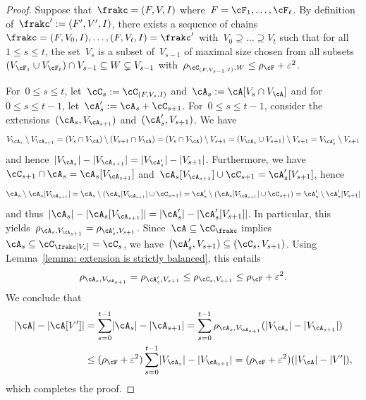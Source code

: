 \documentclass[11pt]{amsart}
\newcommand{\eps}{\varepsilon}
\DeclarePairedDelimiter{\abs}{\lvert}{\rvert}
\theoremstyle{definition}
\numberwithin{equation}{section}
\begin{document}
	\begin{proof}
		Suppose that~$\frakc=(F,V,I)$ where~$F=\cF_1,\ldots,\cF_\ell$.
		By definition of~$\frakc':=(F',V',I)$, there exists a sequence of chains~$\frakc=(F,V_0,I),\ldots,(F,V_t,I)=\frakc'$ with~$V_0\supseteq\ldots\supseteq V_t$ such that for all~$1\leq s\leq t$, the set~$V_s$ is a subset of~$V_{s-1}$ of maximal size chosen from all subsets~$(V_{\cF_1}\cup V_{\cF_\ell})\cap V_{s-1}\subseteq W\subsetneq V_{s-1}$ with~$\rho_{\cC_{(F,V_{s-1},I)},W}\leq \rho_\cF+\eps^2$.
		
		For~$0\leq s\leq t$, let~$\cC_s:=\cC_{(F,V_s,I)}$ and~$\cA_s:=\cA[V_s\cap V_\cA]$ and for~$0\leq s\leq t-1$, let~$\cA_s':=\cA_s+\cC_{s+1}$.
		For~$0\leq s\leq t-1$, consider the extensions~$(\cA_s,V_{\cA_{s+1}})$ and~$(\cA_s',V_{s+1})$.
		We have
		\begin{equation*}
			V_{\cA_s}\setminus V_{\cA_{s+1}}
			=(V_s \cap V_\cA)\setminus(V_{s+1}\cap V_\cA)
			=(V_s\cap V_\cA)\setminus V_{s+1}
			=(V_{\cA_s}\cup V_{s+1})\setminus V_{s+1}
			=V_{\cA_s'}\setminus V_{s+1}
		\end{equation*}
		and hence~$\abs{V_{\cA_s}}-\abs{V_{\cA_{s+1}}}=\abs{V_{\cA_s'}}-\abs{V_{s+1}}$.
		Furthermore, we have~$\cC_{s+1}\cap \cA_s= \cA_s[V_{\cA_{s+1}}]$ and~$\cA_s[V_{\cA_{s+1}}]\cup \cC_{s+1}=\cA_s'[V_{s+1}]$, hence
		\begin{equation*}
			\cA_s\setminus \cA_s[V_{\cA_{s+1}}]
			=\cA_s\setminus (\cA_s[V_{\cA_{s+1}}]\cup \cC_{s+1})
			=\cA_s'\setminus (\cA_s[V_{\cA_{s+1}}]\cup \cC_{s+1})
			=\cA_s'\setminus \cA_s'[V_{s+1}]
		\end{equation*}
		and thus~$\abs{\cA_s}-\abs{\cA_s[V_{\cA_{s+1}}]}=\abs{\cA_s'}-\abs{\cA_s'[V_{s+1}]}$.
		In particular, this yields~$\rho_{\cA_s,V_{\cA_{s+1}}}=\rho_{\cA_s',V_{s+1}}$.
		Since~$\cA\subseteq\cC_\frakc$ implies~$\cA_s\subseteq \cC_\frakc[V_s]=\cC_s$, we have~$(\cA_{s}',V_{s+1})\subseteq (\cC_s,V_{s+1})$.
		Using Lemma~\ref{lemma: extension is strictly balanced}, this entails
		\begin{equation*}
			\rho_{\cA_s,V_{\cA_{s+1}}}
			=\rho_{\cA_s',V_{s+1}}
			\leq \rho_{\cC_s,V_{s+1}}
			\leq \rho_\cF+\eps^2.
		\end{equation*}
		We conclude that
		\begin{align*}
			\abs{\cA}-\abs{\cA[V']}
			&=\sum_{s=0}^{t-1} \abs{\cA_{s}}-\abs{\cA_{s+1}}
			=\sum_{s=0}^{t-1} \rho_{\cA_s,V_{\cA_{s+1}}}(\abs{V_{\cA_s}}-\abs{V_{\cA_{s+1}}})\\
			&\leq (\rho_{\cF}+\eps^2)\sum_{s=0}^{t-1} \abs{V_{\cA_s}}-\abs{V_{\cA_{s+1}}}
			=(\rho_{\cF}+\eps^2)(\abs{V_\cA}-\abs{V'}),
		\end{align*}
		which completes the proof.		
	\end{proof}
	
\end{document}
